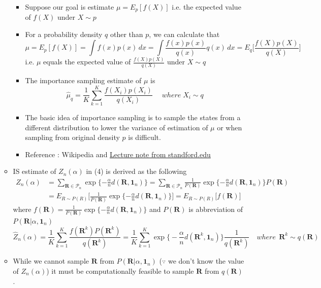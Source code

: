 \documentclass[12pt]{article}
\begin{document}
\begin{itemize}
\begin{itemize}
        \begin{itemize}
            \item Suppose our goal is estimate $\mu=E_p[f(X)]$ i.e. the expected value of $f(X)$ under $X\sim p$
            \item For a probability density $q$ other than $p$, we can calculate that $$\mu=E_p[f(X)]=\int f(x)p(x)\, dx=\int \frac{f(x)p(x)}{q(x)}q(x)\,dx=E_q\Big[\frac{f(X)p(X)}{q(X)}\Big] $$ 
            i.e. $\mu$ equals the expected value of $\frac{f(X)p(X)}{q(X)}$ under $X\sim q$
            \item The importance sampling estimate of $\mu$ is $$\hat \mu_q =\frac{1}{K}\sum_{k=1}^K \frac{f(X_i)p(X_i)}{q(X_i)} \quad \; where \; X_i\sim q$$
            \item The basic idea of importance sampling is to sample the states from a different distribution to lower the variance of estimation of $\mu$ or when sampling from original density $p$ is difficult.
            \item Reference : Wikipedia and \href{https://statweb.stanford.edu/~owen/mc/Ch-var-is.pdf}{Lecture note from standford.edu}
        \end{itemize}
        \item IS estimate of $Z_n(\alpha)$ in (4) is derived as the following
        \begin{align*}
            Z_n(\alpha)&=\sum_{\mathbf{R}\in \mathcal{P}_n}\exp\{-\frac{\alpha}{n}d(\mathbf{R},\mathbf{1}_n)\} =\sum_{\mathbf{R}\in \mathcal{P}_n}\frac{1}{P(\mathbf{R})}\exp\{-\frac{\alpha}{n}d(\mathbf{R},\mathbf{1}_n)\}P(\mathbf{R}) \\ &=E_{R\sim P(R)}\Big[ \frac{1}{P(\mathbf{R})}\exp\{-\frac{\alpha}{n}d(\mathbf{R},\mathbf{1}_n)\}\Big] = E_{R\sim P(R)}\big[f(\mathbf{R}) \big]
        \end{align*}
        where $f(\mathbf{R})=\frac{1}{P(\mathbf{R})}\exp\{-\frac{\alpha}{n}d(\mathbf{R},\mathbf{1}_n)\}$ and $P(\mathbf{R})$ is abbreviation of $P(\mathbf{R}|\alpha, \mathbf{1}_n)$
        \begin{equation*}
            \hat{Z}_n(\alpha)=\frac{1}{K}\sum_{k=1}^K \frac{f(\mathbf{R}^k)P(\mathbf{R}^k)}{q(\mathbf{R}^k)} =\frac{1}{K}\sum_{k=1}^K \exp\big\{-\frac{\alpha}{n}d(\mathbf{R}^k, \mathbf{1}_n) \big\}\frac{1}{q(\mathbf{R}^k)}\quad where \;\, \mathbf{R}^k\sim q(\mathbf{R})
        \end{equation*}
        \item While we cannot sample $\mathbf{R}$ from $P(\mathbf{R}|\alpha, \mathbf{1}_n)$ ($\because$ we don't know the value of $Z_n(\alpha)$) it must be computationally feasible to sample $\mathbf{R}$ from $q(\mathbf{R})$.

\end{itemize}
\end{itemize}
\end{document}
